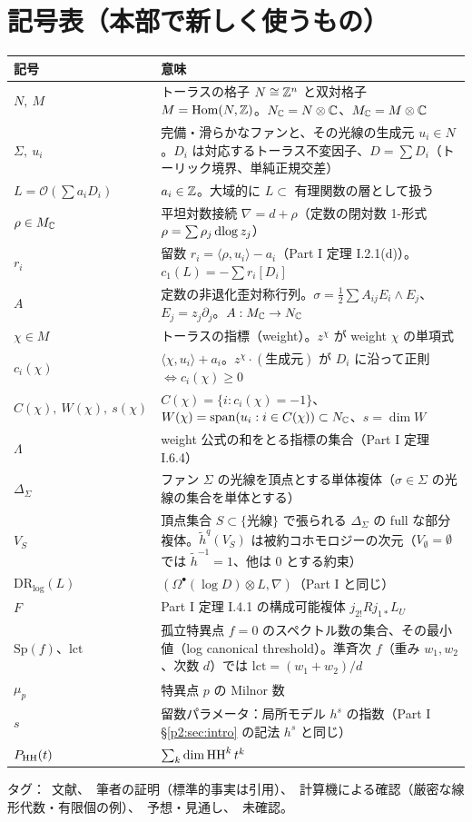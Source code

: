 \section{記号表（本部で新しく使うもの）}\label{p2:sec:notation}
\begin{longtable}{>{\raggedright\arraybackslash}p{3.6cm}>{\raggedright\arraybackslash}p{11.4cm}}
\toprule 記号 & 意味\\ \midrule\endhead
$N,\ M$ & トーラスの格子 $N\cong\mathbb Z^n$ と双対格子 $M=\mathrm{Hom}(N,\mathbb Z)$。$N_\mathbb C=N\otimes\mathbb C$、$M_\mathbb C=M\otimes\mathbb C$\\
$\Sigma,\ u_i$ & 完備・滑らかなファンと、その光線の生成元 $u_i\in N$。$D_i$ は対応するトーラス不変因子、$D=\sum D_i$（トーリック境界、単純正規交差）\\
$L=\mathcal O(\sum a_iD_i)$ & $a_i\in\mathbb Z$。大域的に $L\subset$ 有理関数の層として扱う\\
$\rho\in M_\mathbb C$ & 平坦対数接続 $\nabla=d+\rho$（定数の閉対数 1-形式 $\rho=\sum\rho_j\,\mathrm{dlog}\, z_j$）\\
$r_i$ & 留数 $r_i=\langle\rho,u_i\rangle-a_i$（Part I 定理 I.2.1(d)）。$c_1(L)=-\sum r_i[D_i]$\\
$A$ & 定数の非退化歪対称行列。$\sigma=\tfrac12\sum A_{ij}E_i\wedge E_j$、$E_j=z_j\partial_j$。$A:M_\mathbb C\to N_\mathbb C$\\
$\chi\in M$ & トーラスの指標（weight）。$z^\chi$ が weight $\chi$ の単項式\\
$c_i(\chi)$ & $\langle\chi,u_i\rangle+a_i$。$z^\chi\cdot(\text{生成元})$ が $D_i$ に沿って正則 $\Leftrightarrow c_i(\chi)\ge0$\\
$C(\chi),\ W(\chi),\ s(\chi)$ & $C(\chi)=\{i:c_i(\chi)=-1\}$、$W(\chi)=\mathrm{span}(u_i:i\in C(\chi))\subset N_\mathbb C$、$s=\dim W$\\
$\Lambda$ & weight 公式の和をとる指標の集合（Part I 定理 I.6.4）\\
$\Delta_\Sigma$ & ファン $\Sigma$ の光線を頂点とする単体複体（$\sigma\in\Sigma$ の光線の集合を単体とする）\\
$V_S$ & 頂点集合 $S\subset\{\text{光線}\}$ で張られる $\Delta_\Sigma$ の full な部分複体。$\tilde h^q(V_S)$ は被約コホモロジーの次元（$V_\emptyset=\emptyset$ では $\tilde h^{-1}=1$、他は 0 とする約束）\\
$\mathrm{DR}_{\log}(L)$ & $(\Omega^\bullet(\log D)\otimes L,\nabla)$（Part I と同じ）\\
$F$ & Part I 定理 I.4.1 の構成可能複体 $j_{2!}Rj_{1*}L_U$\\
$\mathrm{Sp}(f)$、$\mathrm{lct}$ & 孤立特異点 $f=0$ のスペクトル数の集合、その最小値（log canonical threshold）。準斉次 $f$（重み $w_1,w_2$、次数 $d$）では $\mathrm{lct}=(w_1+w_2)/d$\\
$\mu_p$ & 特異点 $p$ の Milnor 数\\
$s$ & 留数パラメータ：局所モデル $h^s$ の指数（Part I \S\ref{p2:sec:intro} の記法 $h^s$ と同じ）\\
$P_{\mathrm{HH}}(t)$ & $\sum_k\dim\mathrm{HH}^k\,t^k$\\
\bottomrule
\end{longtable}
\noindent タグ：\tC\ 文献、\tP\ 筆者の証明（標準的事実は引用）、\tV\ 計算機による確認（厳密な線形代数・有限個の例）、\tK\ 予想・見通し、\tQ\ 未確認。

